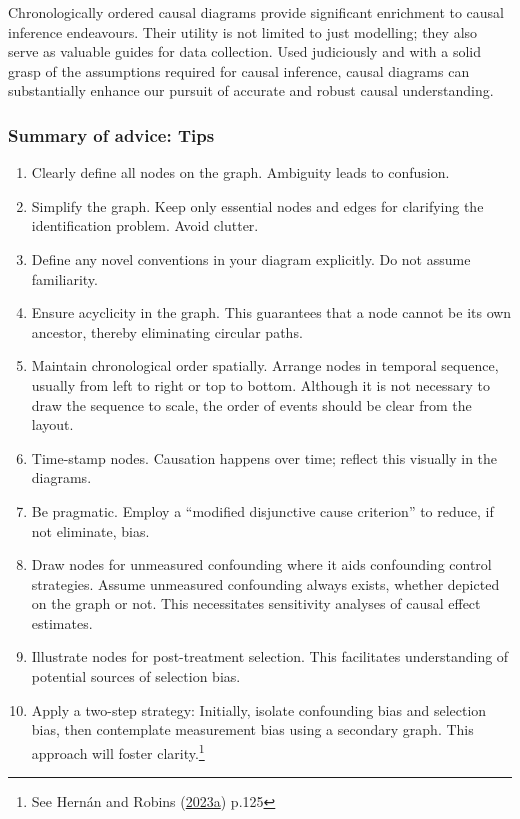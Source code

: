 \documentclass[
  singlecolumn]{article}
\begin{document}
Chronologically ordered causal diagrams provide significant enrichment
to causal inference endeavours. Their utility is not limited to just
modelling; they also serve as valuable guides for data collection. Used
judiciously and with a solid grasp of the assumptions required for
causal inference, causal diagrams can substantially enhance our pursuit
of accurate and robust causal understanding.

\hypertarget{summary-of-advice-tips}{%
\subsubsection{Summary of advice: Tips}\label{summary-of-advice-tips}}

\begin{enumerate}
\def\labelenumi{\arabic{enumi}.}
\item
  Clearly define all nodes on the graph. Ambiguity leads to confusion.
\item
  Simplify the graph. Keep only essential nodes and edges for clarifying
  the identification problem. Avoid clutter.
\item
  Define any novel conventions in your diagram explicitly. Do not assume
  familiarity.
\item
  Ensure acyclicity in the graph. This guarantees that a node cannot be
  its own ancestor, thereby eliminating circular paths.
\item
  Maintain chronological order spatially. Arrange nodes in temporal
  sequence, usually from left to right or top to bottom. Although it is
  not necessary to draw the sequence to scale, the order of events
  should be clear from the layout.
\item
  Time-stamp nodes. Causation happens over time; reflect this visually
  in the diagrams.
\item
  Be pragmatic. Employ a ``modified disjunctive cause criterion'' to
  reduce, if not eliminate, bias.
\item
  Draw nodes for unmeasured confounding where it aids confounding
  control strategies. Assume unmeasured confounding always exists,
  whether depicted on the graph or not. This necessitates sensitivity
  analyses of causal effect estimates.
\item
  Illustrate nodes for post-treatment selection. This facilitates
  understanding of potential sources of selection bias.
\item
  Apply a two-step strategy: Initially, isolate confounding bias and
  selection bias, then contemplate measurement bias using a secondary
  graph. This approach will foster clarity.\footnote{See Hernán and
    Robins (\protect\hyperlink{ref-hernuxe1n2023}{2023a}) p.125}
\end{enumerate}
\end{document}

